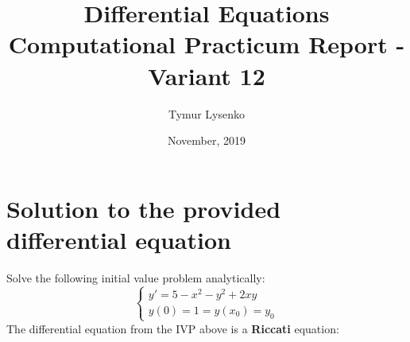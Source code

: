 \documentclass[12pt,a4paper,titlepage]{article}
\title{Differential Equations Computational Practicum Report - Variant 12}
\author{Tymur Lysenko}
\date{November, 2019}
\begin{document}
  \maketitle
  \tableofcontents
  \newpage

  \section{Solution to the provided differential equation} \label{problem}

  Solve the following initial value problem analytically:
  \begin{equation} \label{task_ivp}
    \begin{cases}
      y' = 5 - x^2 - y^2 + 2xy\\
      y(0) = 1 = y(x_0) = y_0
    \end{cases}
  \end{equation}
  The differential equation from the IVP above is a \textbf{Riccati} equation:
\end{document}
